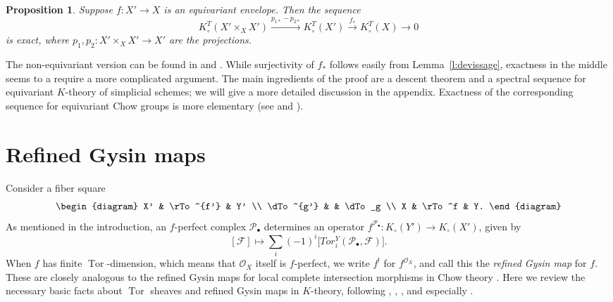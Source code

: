 \documentclass[11pt]{amsart}
\newtheorem{proposition}[theorem]{Proposition}
\theoremstyle{definition}
\begin{document}
\begin{proposition}\label{p:env-exact}
Suppose $f\colon X' \to X$ is an equivariant envelope.  Then the sequence
\[
K^T_\circ(X'\times_X X') \xrightarrow{p_{1*}-p_{2*}} K^T_\circ(X') \xrightarrow{f_*} K^T_\circ(X) \to 0
\] 
is exact, where $p_1,p_2\colon X'\times_X X' \to X'$ are the projections.
\end{proposition}

\noindent The non-equivariant version can be found in \cite[p.~300]{fulton-gillet} and \cite[Corollary~4.4]{gillet}.  While surjectivity of $f_*$ follows easily from Lemma~\ref{l:devissage}, exactness in the middle seems to a require a more complicated argument. The main ingredients of the proof are a descent theorem and a spectral sequence for equivariant $K$-theory of simplicial schemes; we will give a more detailed discussion in the appendix.  Exactness of the corresponding sequence for equivariant Chow groups is more elementary (see \cite[Theorem~1.8]{kimura} and \cite[\S2]{chow}).  

\section{Refined Gysin maps}\label{s:gysin}

Consider a fiber square
\begin{equation}\label{e.fiber}
\begin{diagram}
 X' & \rTo^{f'} & Y' \\
 \dTo^{g'} &  & \dTo_g \\
 X  & \rTo^f   & Y.
\end{diagram}  
\end{equation}
As mentioned in the introduction, an $f$-perfect complex ${\mathscr{P}}_\bullet$ determines an operator $f^{{\mathscr{P}}_\bullet}: K_\circ(Y') \rightarrow K_\circ(X')$, given by
\[
[{\mathscr{F}}] \mapsto \sum_i (-1)^i \big[ Tor^Y_i ({\mathscr{P}}_\bullet, {\mathscr{F}}) \big].
\]
When $f$ has finite $\operatorname{Tor}$-dimension, which means that ${\mathcal{O}}_X$ itself is $f$-perfect, we write $f^!$ for $f^{{\mathcal{O}}_X}$, and call this the \emph{refined Gysin map} for $f$.  These are closely analogous to the refined Gysin maps for local complete intersection morphisms in Chow theory  \cite[\S6.2]{it}.  Here we review the necessary basic facts about $\operatorname{Tor}$ sheaves and refined Gysin maps in $K$-theory, following  \cite[Exp. III]{sga6}, \cite[III.6]{ega}, \cite[VI.6]{fl}, and especially \cite[\S2.2]{ks}.
\end{document}
